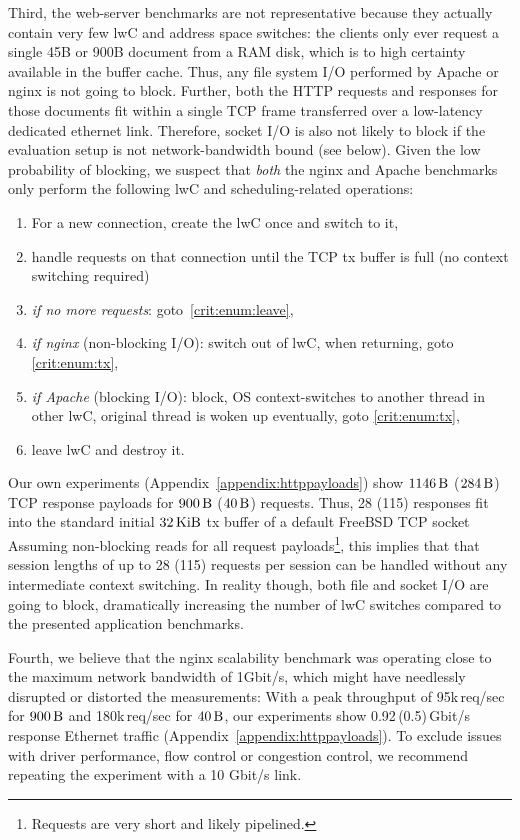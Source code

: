 \documentclass[10pt,twocolumn,a4paper]{article}
\begin{document}
Third, the web-server benchmarks are not representative because they actually contain very few lwC and address space switches:
the clients only ever request a single 45B or 900B document from a RAM disk, which is to high certainty available in the buffer cache.
Thus, any file system I/O performed by Apache or nginx is not going to block.
Further, both the HTTP requests and responses for those documents fit within a single TCP frame transferred over a low-latency dedicated ethernet link.
Therefore, socket I/O is also not likely to block if the evaluation setup is not network-bandwidth bound (see below).
Given the low probability of blocking, we suspect that \textit{both} the nginx and Apache benchmarks only perform the following lwC and scheduling-related operations:
\begin{enumerate}[nosep]
\item For a new connection, create the lwC once and switch to it,
\item\label{crit:enum:tx} handle requests on that connection until the TCP tx buffer is full (no context switching required)
\item \textit{if no more requests}: goto~\ref{crit:enum:leave},
\item \textit{if nginx} (non-blocking I/O): switch out of lwC, when returning, goto \ref{crit:enum:tx},
\item \textit{if Apache} (blocking I/O): block, OS context-switches to another thread in other lwC, original thread is woken up eventually, goto \ref{crit:enum:tx},
\item\label{crit:enum:leave} leave lwC and destroy it.
\end{enumerate}
Our own experiments (Appendix~\ref{appendix:httppayloads}) show $\SI{1146}{\byte}$ ($\SI{284}{\byte}$) TCP response payloads for $\SI{900}{\byte}$ ($\SI{40}{\byte}$) requests.
Thus, 28 (115) responses fit into the standard initial $\SI{32}{\kibi\byte}$ tx buffer of a default FreeBSD TCP socket~\cite{fbsd11tcpsendspace}
Assuming non-blocking reads for all request payloads\footnote{Requests are very short and likely pipelined.}, this implies that that session lengths of up to 28 (115) requests per session can be handled without any intermediate context switching.
In reality though, both file and socket I/O are going to block, dramatically increasing the number of lwC switches compared to the presented application benchmarks.

Fourth, we believe that the nginx scalability benchmark was operating close to the maximum network bandwidth of 1Gbit/s, which might have needlessly disrupted or distorted the measurements:
With a peak throughput of 95k\,req/sec for $\SI{900}{\byte}$ and 180k\,req/sec for $\SI{40}{\byte}$, our experiments show 0.92\,(0.5)\,Gbit/s response Ethernet traffic (Appendix~\ref{appendix:httppayloads}).
To exclude issues with driver performance, flow control or congestion control, we recommend repeating the experiment with a 10 Gbit/s link.
\end{document}
